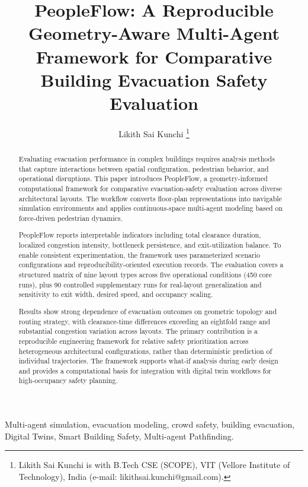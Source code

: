\documentclass[journal]{IEEEtran}
\begin{document}
\title{PeopleFlow: A Reproducible Geometry-Aware Multi-Agent Framework for Comparative Building Evacuation Safety Evaluation}

\author{Likith Sai Kunchi%
\thanks{Likith Sai Kunchi is with B.Tech CSE (SCOPE), VIT (Vellore Institute of Technology), India (e-mail: likithsai.kunchi@gmail.com).}}

\maketitle

\begin{abstract}
Evaluating evacuation performance in complex buildings requires analysis methods that capture interactions between spatial configuration, pedestrian behavior, and operational disruptions. This paper introduces PeopleFlow, a geometry-informed computational framework for comparative evacuation-safety evaluation across diverse architectural layouts. The workflow converts floor-plan representations into navigable simulation environments and applies continuous-space multi-agent modeling based on force-driven pedestrian dynamics.

PeopleFlow reports interpretable indicators including total clearance duration, localized congestion intensity, bottleneck persistence, and exit-utilization balance. To enable consistent experimentation, the framework uses parameterized scenario configurations and reproducibility-oriented execution records. The evaluation covers a structured matrix of nine layout types across five operational conditions (450 core runs), plus 90 controlled supplementary runs for real-layout generalization and sensitivity to exit width, desired speed, and occupancy scaling.

Results show strong dependence of evacuation outcomes on geometric topology and routing strategy, with clearance-time differences exceeding an eightfold range and substantial congestion variation across layouts. The primary contribution is a reproducible engineering framework for relative safety prioritization across heterogeneous architectural configurations, rather than deterministic prediction of individual trajectories. The framework supports what-if analysis during early design and provides a computational basis for integration with digital twin workflows for high-occupancy safety planning.
\end{abstract}

\begin{IEEEkeywords}
Multi-agent simulation, evacuation modeling, crowd safety, building evacuation, Digital Twins, Smart Building Safety, Multi-agent Pathfinding.
\end{IEEEkeywords}
\end{document}
